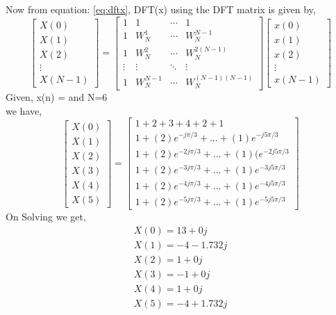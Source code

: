\documentclass[journal,12pt,twocolumn]{IEEEtran}
\renewcommand\thesection{\arabic{section}}
\begin{document}
\begin{enumerate}[label=\thesection.\arabic*.,ref=\thesection.\theenumi]
Now from equation: \eqref{eq:dftx}, DFT(x) using the DFT matrix is given by,
\begin{equation}
 \begin{bmatrix} X(0) \\ X(1) \\ X(2) \\ \vdots \\ X(N-1) \end{bmatrix}
=
\begin{bmatrix}
1 & 1 & \cdots & 1 \\
1 & W_N^1& \cdots & W_N^{N-1}\\
1 & W_N^2 & \cdots & W_N^{2(N-1)}\\
\vdots & \vdots & \ddots & \vdots \\
1 & W_N^{N-1} & \cdots &W_N^{(N-1)(N-1)}
\end{bmatrix}
\begin{bmatrix}
x(0) \\ x(1) \\ x(2) \\ \vdots \\x(N-1)
\end{bmatrix}
\end{equation}
\bigskip
Given,  x(n) =  and N=6\\
we have,
\begin{equation}
\begin{bmatrix} X(0) \\ X(1) \\ X(2) \\ X(3) \\ X(4) \\ X(5) \end{bmatrix}
=
\begin{bmatrix}
1 +2+3+4+2+1 \\ 1+ (2)e^{-j\pi /3} + ... + (1)e^{-j5\pi /3}\\ 1 + (2)e^{-2j\pi /3} + ... +(1)(e^{-2j5\pi /3}\\ 1 + (2)e^{-3j\pi /3} + ... + (1)e^{-3j5\pi /3}\\ 1 + (2)e^{-4j\pi /3} + ... + (1)e^{-4j5\pi /3}\\ 1 + (2)e^{-5j\pi /3} + ... + (1)e^{-5j5\pi /3}
\end{bmatrix}
\end{equation}
\bigskip
On Solving we get,
\begin{align}
    X(0)= 13 + 0j \\
    X(1)= -4 - 1.732j \\
    X(2)= 1 + 0j \\
    X(3)= -1 + 0j \\
    X(4)= 1 + 0j \\
    X(5)= -4 + 1.732j
\end{align}


\end{enumerate}
\end{document}

